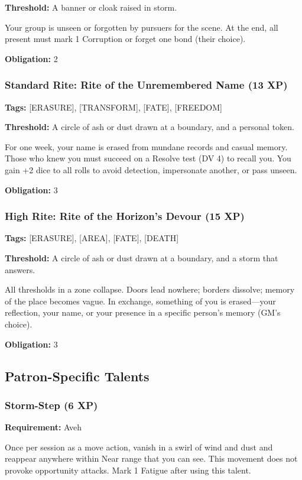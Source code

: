 \textbf{Threshold:} A banner or cloak raised in storm.

Your group is unseen or forgotten by pursuers for the scene. At the end, all present must mark 1 Corruption or forget one bond (their choice).

\textbf{Obligation:} 2

\subsubsection{Standard Rite: Rite of the Unremembered Name (13 XP)}

\textbf{Tags:} [ERASURE], [TRANSFORM], [FATE], [FREEDOM]

\textbf{Threshold:} A circle of ash or dust drawn at a boundary, and a personal token.

For one week, your name is erased from mundane records and casual memory. Those who knew you must succeed on a Resolve test (DV 4) to recall you. You gain +2 dice to all rolls to avoid detection, impersonate another, or pass unseen.

\textbf{Obligation:} 3

\subsubsection{High Rite: Rite of the Horizon's Devour (15 XP)}

\textbf{Tags:} [ERASURE], [AREA], [FATE], [DEATH]

\textbf{Threshold:} A circle of ash or dust drawn at a boundary, and a storm that answers.

All thresholds in a zone collapse. Doors lead nowhere; borders dissolve; memory of the place becomes vague. In exchange, something of you is erased—your reflection, your name, or your presence in a specific person's memory (GM's choice).

\textbf{Obligation:} 3

\subsection{Patron-Specific Talents}

\subsubsection{Storm-Step (6 XP)}

\textbf{Requirement:} Aveh

Once per session as a move action, vanish in a swirl of wind and dust and reappear anywhere within Near range that you can see. This movement does not provoke opportunity attacks. Mark 1 Fatigue after using this talent.


